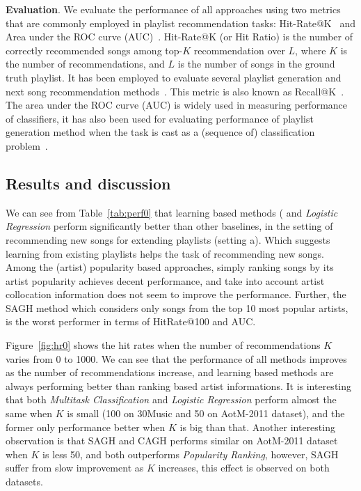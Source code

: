 {\bf Evaluation}.
We evaluate the performance of all approaches using two metrics that are commonly employed in playlist recommendation tasks:
Hit-Rate@K~\cite{hariri2012context} and Area under the ROC curve (AUC)~\cite{manning2008introIR}.
%
%
Hit-Rate@K (or Hit Ratio) is the number of correctly recommended songs among top-$K$ recommendation over $L$,
where $K$ is the number of recommendations, and $L$ is the number of songs in the ground truth playlist.
It has been employed to evaluate several playlist generation and next song recommendation
methods~\cite{hariri2012context,bonnin2013evaluating,bonnin2015automated,jannach2015beyond}.
This metric is also known as Recall@K~\cite{schedl2017}.
%
The area under the ROC curve (AUC) is widely used in measuring performance of classifiers,
it has also been used for evaluating performance of playlist generation method when the task
is cast as a (sequence of) classification problem~\cite{ben2017groove}.


\subsection{Results and discussion}

We can see from Table~\ref{tab:perf0} that learning based methods (
and {\it Logistic Regression} perform significantly better than other baselines, in the setting of
recommending new songs for extending playlists (setting a).
Which suggests learning from existing playlists helps the task of recommending new songs.
Among the (artist) popularity based approaches, 
simply ranking songs by its artist popularity achieves decent performance,
and take into account artist collocation information does not seem to improve the performance.
Further, the SAGH method which considers only songs from the top 10 most popular artists,
is the worst performer in terms of HitRate@100 and AUC.

Figure~\ref{fig:hr0} shows the hit rates when the number of recommendations $K$ varies from 0 to 1000.
We can see that the performance of all methods improves as the number of recommendations increase,
and learning based methods are always performing better than ranking based artist informations.
It is interesting that both {\it Multitask Classification} and {\it Logistic Regression} perform 
almost the same when $K$ is small (100 on 30Music and 50 on AotM-2011 dataset), 
and the former only performance better when $K$ is big than that.
Another interesting observation is that SAGH and CAGH performs similar on AotM-2011 dataset when $K$
is less 50, and both outperforms {\it Popularity Ranking}, however, SAGH suffer from slow improvement
as $K$ increases, this effect is observed on both datasets.


